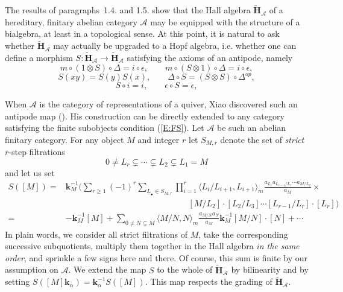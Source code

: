 \documentclass[a4paper,10pt]{amsart}
\def\H{\mathbf{H}}
\def\a{\alpha}
\def\A{\mathcal{A}}
\numberwithin{equation}{section}
\begin{document}
\vspace{.15in}

The results of paragraphs~1.4. and 1.5. show that the Hall algebra $\widetilde{\H}_{\A}$ of a hereditary, finitary abelian category $\mathcal{A}$ may be equipped with the structure of a bialgebra, at least in a topological sense.  At this point, it is natural to ask whether $\widetilde{\H}_{\A}$ may actually be upgraded to a Hopf algebra, i.e. whether one can define a morphism $S: \widetilde{\H}_{\A} \to \widetilde{\H}_{\A}$ satisfying the axioms of an antipode, namely
\begin{equation}\label{E:antipode1}
m \circ (1 \otimes S) \circ {\Delta} = i \circ \epsilon, \qquad
m \circ (S \otimes 1) \circ {\Delta} = i \circ \epsilon,
\end{equation}
\begin{equation}\label{E:antipode2}
S(xy)=S(y)S(x), \qquad {\Delta} \circ S = (S \otimes S) \circ {\Delta}^{op},
\end{equation}
\begin{equation}\label{E:antipode3}
S \circ i=i, \qquad \epsilon \circ S=\epsilon,
\end{equation}


When $\mathcal{A}$ is the category of representations of a quiver, Xiao discovered such an antipode map (\cite{Xiao1}). His construction can be directly extended to any category satisfying the finite subobjects condition (\ref{E:FS}). Let $\mathcal{A}$ be such an abelian finitary category.
For any object $M$ and integer $r$ let $S_{M,r}$ denote the set of \textit{strict} $r$-step filtrations
$$0 \neq L_r \subsetneq \cdots \subsetneq L_2 \subsetneq L_1=M$$
and let us set
\begin{equation}\label{E:antipodef}
\begin{split}
S([M])=&\mathbf{k}_M^{-1} \bigg( \sum_{r \geq 1} (-1)^r \sum_{\underline{L}_{\bullet} \in S_{M,r}} \prod_{i=1}^r \langle L_i/L_{i+1}, L_{i+1} \rangle_m \frac{a_{L_r} a_{L_{r-1}/L_r} \cdots a_{M/L_2}}{a_M} \times \\
&\qquad \qquad \qquad \qquad \qquad \qquad \qquad \; \;  [M/L_2]  \cdot [L_2/L_3] \cdots [L_{r-1}/L_r] \cdot [L_r] \bigg)\\
=& -\mathbf{k}_{M}^{-1}[M] + \sum_{0 \neq N \subsetneq M} \langle M/N,N \rangle_m \frac{a_{M/N} a_N}{a_M} \mathbf{k}_M^{-1}[M/N] \cdot [N] + \cdots
\end{split}
\end{equation}
In plain words, we consider all strict filtrations of $M$, take the corresponding successive subquotients, multiply them together in the Hall algebra \textit{in the same order}, and sprinkle a few signs here and there. Of course, this sum is finite by our assumption on $\mathcal{A}$. We extend the map $S$ to the whole of $\widetilde{\H}_{\A}$ by bilinearity and by setting $S([M]\mathbf{k}_{\a})=\mathbf{k}_{\a}^{-1} S([M])$. This map respects the grading of $\widetilde{\H}_{\A}$.
\end{document}
